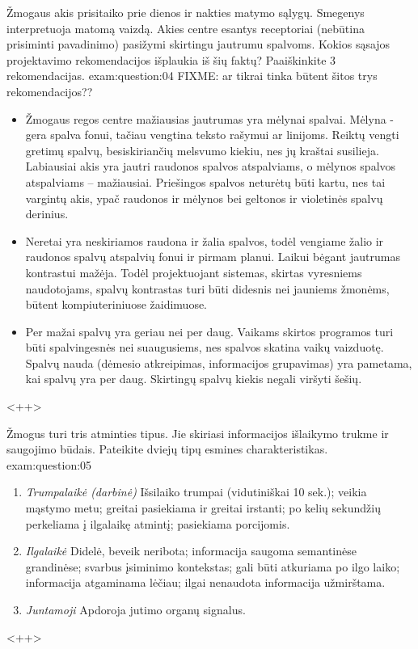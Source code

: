 \begin{question}{%
  Žmogaus akis prisitaiko prie dienos ir nakties matymo sąlygų. Smegenys
  interpretuoja matomą vaizdą. Akies centre esantys receptoriai
  (nebūtina prisiminti pavadinimo) pasižymi skirtingu jautrumu spalvoms.
  Kokios sąsajos projektavimo rekomendacijos išplaukia iš šių faktų?
  Paaiškinkite 3 rekomendacijas.
  }{exam:question:04}
  FIXME: ar tikrai tinka būtent šitos trys rekomendacijos??
    \begin{itemize}
      \item{
        Žmogaus regos centre mažiausias jautrumas yra mėlynai spalvai. Mėlyna - gera
        spalva fonui, tačiau vengtina teksto rašymui ar linijoms.
        Reiktų vengti gretimų spalvų, besiskiriančių melsvumo kiekiu, nes jų kraštai 
        susilieja. Labiausiai akis yra jautri raudonos spalvos atspalviams, o mėlynos 
        spalvos atspalviams – mažiausiai. Priešingos spalvos neturėtų būti kartu, nes 
        tai vargintų akis, ypač raudonos ir mėlynos bei geltonos ir violetinės spalvų 
        derinius.
        }
      \item{
        Neretai yra neskiriamos raudona ir žalia spalvos, todėl vengiame žalio ir 
        raudonos spalvų atspalvių fonui ir pirmam planui.
        Laikui bėgant jautrumas kontrastui mažėja. Todėl projektuojant sistemas, 
        skirtas vyresniems naudotojams, spalvų kontrastas turi būti didesnis nei jauniems 
        žmonėms, būtent kompiuteriniuose žaidimuose.
        }
      \item{Per mažai spalvų yra geriau nei per daug. Vaikams  skirtos programos 
        turi būti spalvingesnės nei suaugusiems, nes spalvos skatina vaikų vaizduotę. 
        Spalvų nauda (dėmesio atkreipimas, informacijos grupavimas) yra pametama, kai 
        spalvų yra per daug. Skirtingų spalvų kiekis negali viršyti šešių.
        }
    \end{itemize}
  <++>
\end{question}

\begin{question}{%
  Žmogus turi tris atminties tipus. Jie skiriasi informacijos išlaikymo
  trukme ir saugojimo būdais. Pateikite dviejų tipų esmines
  charakteristikas.
  }{exam:question:05}
  \begin{enumerate}
    \item \emph{Trumpalaikė (darbinė)} Išsilaiko trumpai (vidutiniškai 10 sek.); 
      veikia mąstymo metu; greitai pasiekiama ir greitai irstanti; po kelių sekundžių 
      perkeliama į ilgalaikę atmintį; pasiekiama porcijomis.
    \item \emph{Ilgalaikė} Didelė, beveik neribota; informacija saugoma semantinėse
      grandinėse; svarbus įsiminimo kontekstas; gali būti atkuriama po ilgo laiko;
      informacija atgaminama lėčiau; ilgai nenaudota informacija užmirštama.
    \item \emph{Juntamoji} Apdoroja jutimo organų signalus.
  \end{enumerate}
  <++>
\end{question}

